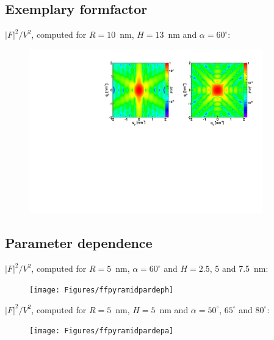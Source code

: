 \subsection{Exemplary formfactor}
$|F|^2/V^2$, computed for $R=10$~nm, $H=13$~nm and $\alpha=60^{\circ}$:
\begin{figure}[h]
\begin{center}
\includegraphics[width=0.9\textwidth]{Figures/figffpyramid}
\end{center}
\end{figure}

\par

\subsection{Parameter dependence}
$|F|^2/V^2$, computed for $R=5$~nm, $\alpha=60^{\circ}$ and $H=2.5$, 5 and 7.5~nm:
\begin{figure}[h]
\begin{center}
\texttt{[image: Figures/ffpyramidpardeph]}
\end{center}
\end{figure}

$|F|^2/V^2$, computed for $R=5$~nm, $H=5$~nm and $\alpha=50^{\circ}$, $65^{\circ}$ and $80^{\circ}$:
\begin{figure}[h]
\begin{center}
\texttt{[image: Figures/ffpyramidpardepa]}
\end{center}
\end{figure}

